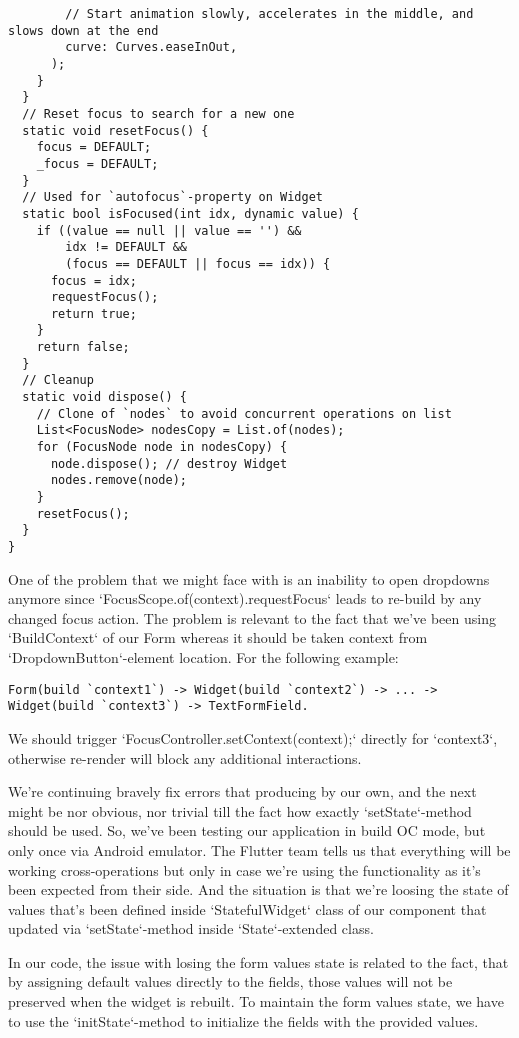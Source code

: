 \begin{lstlisting}
        // Start animation slowly, accelerates in the middle, and slows down at the end
        curve: Curves.easeInOut,
      );
    }
  }
  // Reset focus to search for a new one
  static void resetFocus() {
    focus = DEFAULT;
    _focus = DEFAULT;
  }
  // Used for `autofocus`-property on Widget
  static bool isFocused(int idx, dynamic value) {
    if ((value == null || value == '') &&
        idx != DEFAULT &&
        (focus == DEFAULT || focus == idx)) {
      focus = idx;
      requestFocus();
      return true;
    }
    return false;
  }
  // Cleanup
  static void dispose() {
    // Clone of `nodes` to avoid concurrent operations on list
    List<FocusNode> nodesCopy = List.of(nodes);
    for (FocusNode node in nodesCopy) {
      node.dispose(); // destroy Widget
      nodes.remove(node);
    }
    resetFocus();
  }
}
\end{lstlisting}

One of the problem that we might face with is an inability to open dropdowns anymore since 
`FocusScope.of(context).requestFocus` leads to re-build by any changed focus action. The problem is relevant to the
fact that we've been using `BuildContext` of our Form whereas it should be taken context from `DropdownButton`-element 
location. For the following example:

\begin{lstlisting}
Form(build `context1`) -> Widget(build `context2`) -> ... -> Widget(build `context3`) -> TextFormField.
\end{lstlisting}

\noindent We should trigger `FocusController.setContext(context);` directly for `context3`, otherwise re-render will 
block any additional interactions.

We're continuing bravely fix errors that producing by our own, and the next might be nor obvious, nor trivial till 
the fact how exactly `setState`-method should be used. So, we've been testing our application in build OC mode, but 
only once via Android emulator. The Flutter team tells us that everything will be working cross-operations but only 
in case we're using the functionality as it's been expected from their side. And the situation is that we're loosing 
the state of values that's been defined inside `StatefulWidget` class of our component that updated via 
`setState`-method inside `State`-extended class.

In our code, the issue with losing the form values state is related to the fact, that by assigning default values 
directly to the fields, those values will not be preserved when the widget is rebuilt. To maintain the form values 
state, we have to use the `initState`-method to initialize the fields with the provided values.


